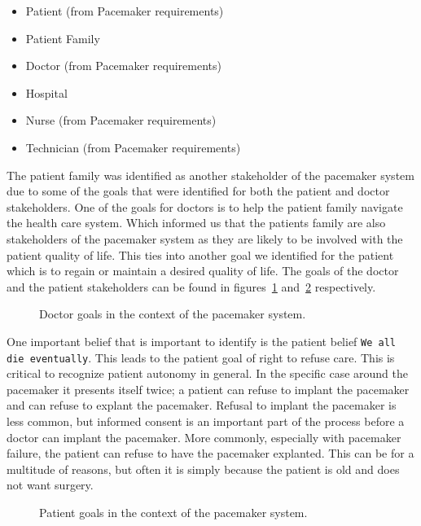 \begin{itemize}
	\item Patient (from Pacemaker requirements)
	\item Patient Family
	\item Doctor (from Pacemaker requirements)
	\item Hospital
	\item Nurse (from Pacemaker requirements)
	\item Technician (from Pacemaker requirements)
\end{itemize}

The patient family was identified as another stakeholder of the pacemaker system due to some of the goals that were identified for both the patient and doctor stakeholders. One of the goals for doctors is to help the patient family navigate the health care system. Which informed us that the patients family are also stakeholders of the pacemaker system as they are likely to be involved with the patient quality of life. This ties into another goal we identified for the patient which is to regain or maintain a desired quality of life. The goals of the doctor and the patient stakeholders can be found in figures~\ref{fig:doctor_goals} and~\ref{fig:patient_goals} respectively.

\begin{figure}
	\centering
	
	\caption{Doctor goals in the context of the pacemaker system.}
	\label{fig:doctor_goals}
\end{figure}

One important belief that is important to identify is the patient belief \texttt{We all die eventually}. This leads to the patient goal of right to refuse care. This is critical to recognize patient autonomy in general. In the specific case around the pacemaker it presents itself twice; a patient can refuse to implant the pacemaker and can refuse to explant the pacemaker. Refusal to implant the pacemaker is less common, but informed consent is an important part of the process before a doctor can implant the pacemaker. More commonly, especially with pacemaker failure, the patient can refuse to have the pacemaker explanted. This can be for a multitude of reasons, but often it is simply because the patient is old and does not want surgery.

\begin{figure}
	\centering
	
	\caption{Patient goals in the context of the pacemaker system.}
	\label{fig:patient_goals}
\end{figure}

